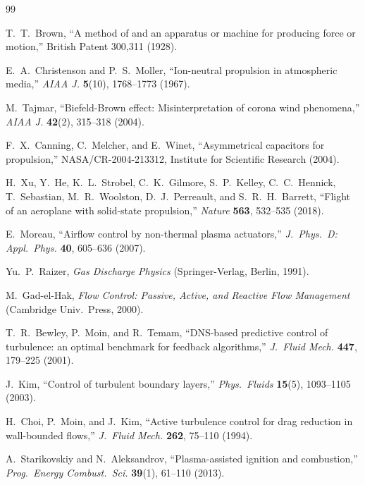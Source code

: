 \documentclass[12pt,twocolumn]{article}
\begin{document}
\begin{thebibliography}{99}

T.~T.~Brown, ``A method of and an apparatus or machine for producing
force or motion,'' British Patent 300,311 (1928).

E.~A.~Christenson and P.~S.~Moller, ``Ion-neutral propulsion in
atmospheric media,'' \textit{AIAA J.} \textbf{5}(10), 1768--1773
(1967).

M.~Tajmar, ``Biefeld-Brown effect: Misinterpretation of corona wind
phenomena,'' \textit{AIAA J.} \textbf{42}(2), 315--318 (2004).

F.~X.~Canning, C.~Melcher, and E.~Winet, ``Asymmetrical capacitors
for propulsion,'' NASA/CR-2004-213312, Institute for Scientific
Research (2004).

H.~Xu, Y.~He, K.~L.~Strobel, C.~K.~Gilmore, S.~P.~Kelley,
C.~C.~Hennick, T.~Sebastian, M.~R.~Woolston, D.~J.~Perreault, and
S.~R.~H.~Barrett, ``Flight of an aeroplane with solid-state
propulsion,'' \textit{Nature} \textbf{563}, 532--535 (2018).

E.~Moreau, ``Airflow control by non-thermal plasma actuators,''
\textit{J.\ Phys.\ D: Appl.\ Phys.} \textbf{40}, 605--636 (2007).

Yu.~P.~Raizer, \textit{Gas Discharge Physics} (Springer-Verlag,
Berlin, 1991).

M.~Gad-el-Hak, \textit{Flow Control: Passive, Active, and Reactive
Flow Management} (Cambridge Univ.\ Press, 2000).

T.~R.~Bewley, P.~Moin, and R.~Temam, ``DNS-based predictive control
of turbulence: an optimal benchmark for feedback algorithms,''
\textit{J.\ Fluid Mech.} \textbf{447}, 179--225 (2001).

J.~Kim, ``Control of turbulent boundary layers,'' \textit{Phys.\
Fluids} \textbf{15}(5), 1093--1105 (2003).

H.~Choi, P.~Moin, and J.~Kim, ``Active turbulence control for drag
reduction in wall-bounded flows,'' \textit{J.\ Fluid Mech.}
\textbf{262}, 75--110 (1994).

A.~Starikovskiy and N.~Aleksandrov, ``Plasma-assisted ignition and
combustion,'' \textit{Prog.\ Energy Combust.\ Sci.} \textbf{39}(1),
61--110 (2013).


\end{thebibliography}
\end{document}
